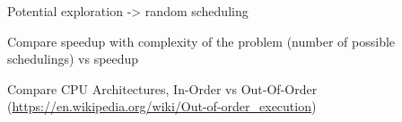 Potential exploration -> random scheduling

Compare speedup with complexity of the problem (number of possible schedulings) vs speedup

Compare CPU Architectures, In-Order vs Out-Of-Order (\url{https://en.wikipedia.org/wiki/Out-of-order_execution})

